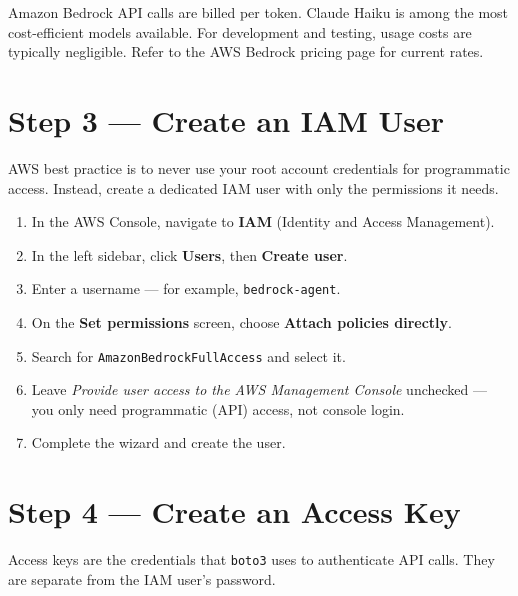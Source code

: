 \documentclass[12pt, a4paper]{article}
\begin{document}
\begin{notebox}
Amazon Bedrock API calls are billed per token. Claude Haiku is among the most cost-efficient models available. For development and testing, usage costs are typically negligible. Refer to the AWS Bedrock pricing page for current rates.
\end{notebox}

\section{Step 3 — Create an IAM User}

AWS best practice is to never use your root account credentials for programmatic access. Instead, create a dedicated IAM user with only the permissions it needs.

\begin{enumerate}[leftmargin=1.5em]
  \item In the AWS Console, navigate to \textbf{IAM} (Identity and Access Management).
  \item In the left sidebar, click \textbf{Users}, then \textbf{Create user}.
  \item Enter a username — for example, \texttt{bedrock-agent}.
  \item On the \textbf{Set permissions} screen, choose \textbf{Attach policies directly}.
  \item Search for \texttt{AmazonBedrockFullAccess} and select it.
  \item Leave \textit{Provide user access to the AWS Management Console} unchecked — you only need programmatic (API) access, not console login.
  \item Complete the wizard and create the user.
\end{enumerate}

\section{Step 4 — Create an Access Key}

Access keys are the credentials that \texttt{boto3} uses to authenticate API calls. They are separate from the IAM user's password.
\end{document}
